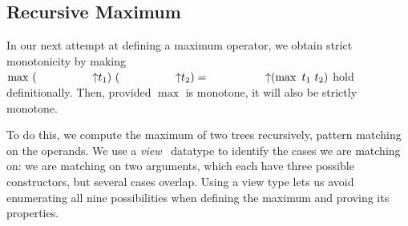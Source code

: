 



\subsection{Recursive Maximum}

In our next attempt at defining a maximum operator, we
obtain strict monotonicity by making $\max\ (\up t_1) \ (\up t_2) = \up (\max\ t_1\ t_2)$
hold definitionally. Then, provided $\max$ is monotone, it will also be
strictly monotone.

To do this, we compute the maximum of two trees recursively,
pattern matching on the operands. We use a \textit{view}~\citep{TODO}
datatype to identify the cases we are matching on: we are matching on two arguments,
which each have three possible constructors, but several cases overlap.
Using a view type lets us avoid enumerating all nine possibilities when defining
the maximum and proving its properties.

\begin{code}[hide]%
%
\>[2]\AgdaSpace{}%
\AgdaSpace{}%
\AgdaSpace{}%
\AgdaSpace{}%
\AgdaSymbol{(}\AgdaSpace{}%
\AgdaSymbol{;}\AgdaSpace{}%
\AgdaOperator{\AgdaFunction{\AgdaUnderscore{}<\AgdaUnderscore{}}}\AgdaSymbol{)}\<%
\\
%
\>[2]\AgdaSpace{}%
\AgdaSpace{}%
\<%
\\
%
\>[2]\AgdaSpace{}%
\AgdaSpace{}%
\<%
\\
%
\>[2]\AgdaSpace{}%
\AgdaSpace{}%
\<%
\\
%
\>[2]\AgdaSpace{}%
\AgdaSpace{}%
\<%
\end{code}

